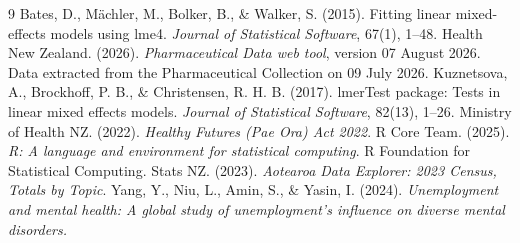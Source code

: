 \documentclass[11pt,a4paper]{article}
\begin{document}
\newpage
\begin{thebibliography}{9}
 Bates, D., M\"achler, M., Bolker, B., \& Walker, S. (2015). Fitting linear mixed-effects models using lme4. \textit{Journal of Statistical Software}, 67(1), 1--48.
 Health New Zealand. (2026). \textit{Pharmaceutical Data web tool}, version 07 August 2026. Data extracted from the Pharmaceutical Collection on 09 July 2026.
 Kuznetsova, A., Brockhoff, P. B., \& Christensen, R. H. B. (2017). lmerTest package: Tests in linear mixed effects models. \textit{Journal of Statistical Software}, 82(13), 1--26.
 Ministry of Health NZ. (2022). \textit{Healthy Futures (Pae Ora) Act 2022}.
 R Core Team. (2025). \textit{R: A language and environment for statistical computing}. R Foundation for Statistical Computing.
 Stats NZ. (2023). \textit{Aotearoa Data Explorer: 2023 Census, Totals by Topic}.
 Yang, Y., Niu, L., Amin, S., \& Yasin, I. (2024).
\textit{Unemployment and mental health: A global study of
unemployment's influence on diverse mental disorders.}

\end{thebibliography}
\end{document}
